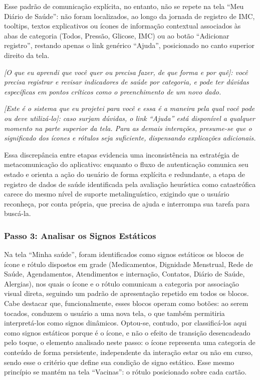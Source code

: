 \documentclass[12pt]{article}
\begin{document}
\begin{abstractp}
Esse padrão de comunicação explícita, no entanto, não se repete na tela
``Meu Diário de Saúde'': não foram localizados, ao longo da jornada de
registro de IMC, tooltips, textos explicativos ou ícones de informação
contextual associados às abas de categoria (Todos, Pressão, Glicose, IMC) ou
ao botão ``Adicionar registro'', restando apenas o link genérico ``Ajuda'',
posicionado no canto superior direito da tela.

\emph{[O que eu aprendi que você quer ou precisa fazer, de que forma e por
quê]: você precisa registrar e revisar indicadores de saúde por categoria, e
pode ter dúvidas específicas em pontos críticos como o preenchimento de um
novo dado.}

\emph{[Este é o sistema que eu projetei para você e essa é a maneira pela
qual você pode ou deve utilizá-lo]: caso surjam dúvidas, o link ``Ajuda''
está disponível a qualquer momento na parte superior da tela. Para as demais
interações, presume-se que o significado dos ícones e rótulos seja
suficiente, dispensando explicações adicionais.}

Essa discrepância entre etapas evidencia uma inconsistência na estratégia de
metacomunicação do aplicativo: enquanto o fluxo de autenticação comunica seu
estado e orienta a ação do usuário de forma explícita e redundante, a etapa
de registro de dados de saúde  identificada pela avaliação heurística como
catastrófica carece do mesmo nível de suporte metalinguístico, exigindo
que o usuário reconheça, por conta própria, que precisa de ajuda e interrompa
sua tarefa para buscá-la.

\subsubsection{Passo 3: Analisar os Signos Estáticos}

Na tela ``Minha saúde'', foram identificados como signos estáticos os blocos
de ícone e rótulo dispostos em grade (Medicamentos, Dignidade Menstrual, Rede
de Saúde, Agendamentos, Atendimentos e internação, Contatos, Diário de
Saúde, Alergias), nos quais o ícone e o rótulo comunicam a categoria por
associação visual direta, seguindo um padrão de apresentação repetido em
todos os blocos. Cabe destacar que, funcionalmente, esses blocos operam como
botões: ao serem tocados, conduzem o usuário a uma nova tela, o que também
permitiria interpretá-los como signos dinâmicos. Optou-se, contudo, por
classificá-los aqui como signos estáticos porque é o ícone, e não o efeito
de transição desencadeado pelo toque, o elemento analisado neste passo: o
ícone representa uma categoria de conteúdo de forma persistente,
independente da interação estar ou não em curso, sendo esse o critério que
define sua condição de signo estático. Esse mesmo princípio se mantém na
tela ``Vacinas'': o rótulo posicionado sobre cada cartão.


\end{abstractp}
\end{document}
